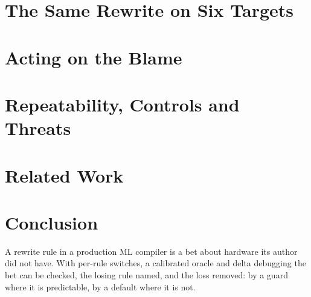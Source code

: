 \documentclass[conference]{IEEEtran}
\begin{document}
\section{The Same Rewrite on Six Targets}


\section{Acting on the Blame}


\section{Repeatability, Controls and Threats}


\section{Related Work}


\section{Conclusion}
A rewrite rule in a production ML compiler is a bet about hardware its author did not have. With per-rule switches, a
calibrated oracle and delta debugging the bet can be checked, the losing rule named, and the loss removed: by a guard
where it is predictable, by a default where it is not.

\balance



\end{document}
